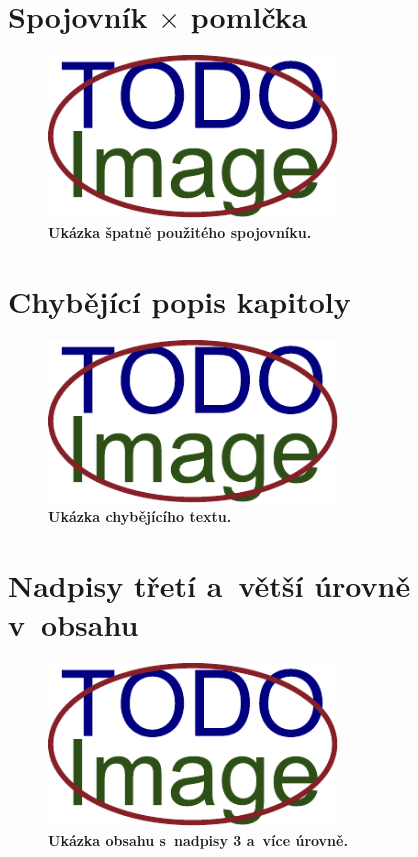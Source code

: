 \section{Spojovník $\times$ pomlčka}
\dummyShortText[10]
\begin{figure}[H]
    \centering
    \includegraphics[width=\linewidth,height=1.7in]{obrazky-figures/placeholder.pdf}
    \caption{\textbf{Ukázka špatně použitého spojovníku.} }
\end{figure}


\section{Chybějící popis kapitoly}
\dummyShortText[10]
\begin{figure}[H]
    \centering
    \includegraphics[width=\linewidth,height=1.7in]{obrazky-figures/placeholder.pdf}
    \caption{\textbf{Ukázka chybějícího textu.} }
\end{figure}


\section{Nadpisy třetí a~větší úrovně v~obsahu}
\dummyShortText[10]
\begin{figure}[H]
    \centering
    \includegraphics[width=\linewidth,height=1.7in]{obrazky-figures/placeholder.pdf}
    \caption{\textbf{Ukázka obsahu s~nadpisy 3 a~více úrovně.} }
\end{figure}


